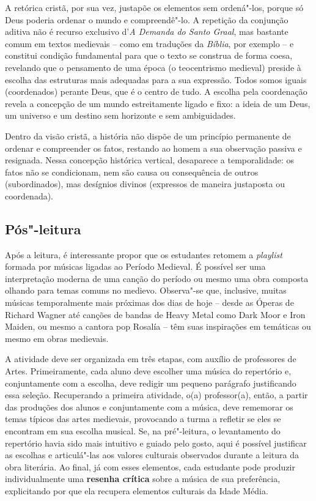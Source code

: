 \documentclass{extarticle}
\begin{document}
A retórica cristã, por sua vez, justapõe os
elementos sem ordená"-los, porque só Deus poderia ordenar o mundo e
compreendê"-lo. A repetição da conjunção aditiva não é recurso exclusivo
d'\emph{A Demanda do Santo Graal}, mas bastante comum em textos
medievais -- como em traduções da \emph{Bíblia}, por exemplo -- e
constitui condição fundamental para que o texto se construa de forma
coesa, revelando que o pensamento de uma época (o teocentrismo medieval)
preside à escolha das estruturas mais adequadas para a sua expressão.
Todos somos iguais (coordenados) perante Deus, que é o centro de tudo. A
escolha pela coordenação revela a concepção de um mundo estreitamente
ligado e fixo: a ideia de um Deus, um universo e um destino sem
horizonte e sem ambiguidades.

Dentro da visão cristã, a história não dispõe de um princípio permanente
de ordenar e compreender os fatos, restando ao homem a sua observação
passiva e resignada. Nessa concepção histórica vertical, desaparece a
temporalidade: os fatos não se condicionam, nem são causa ou
consequência de outros (subordinados), mas desígnios divinos (expressos
de maneira justaposta ou coordenada).


\subsection{Pós"-leitura}


Após a leitura, é interessante propor que os estudantes
retomem a \emph{playlist} formada por músicas ligadas ao Período
Medieval. É possível ser uma interpretação moderna de uma canção do
período ou mesmo uma obra composta olhando para temas comuns no medievo.
Observa"-se que, inclusive, muitas músicas temporalmente mais próximas
dos dias de hoje -- desde as Óperas de Richard Wagner até canções de
bandas de Heavy Metal como Dark Moor e Iron Maiden, ou mesmo a cantora
pop Rosalía -- têm suas inspirações em temáticas ou mesmo em obras
medievais.

A atividade deve ser organizada em três etapas, com auxílio de
professores de Artes. Primeiramente, cada aluno deve escolher uma música
do repertório e, conjuntamente com a escolha, deve redigir um pequeno
parágrafo justificando essa seleção. Recuperando a primeira atividade,
o(a) professor(a), então, a partir das produções dos alunos e
conjuntamente com a música, deve rememorar os temas típicos das artes
medievais, provocando a turma a refletir se eles se encontram em sua
escolha musical. Se, na pré"-leitura, o levantamento do repertório havia
sido mais intuitivo e guiado pelo gosto, aqui é possível justificar as
escolhas e articulá"-las aos valores culturais observados durante a
leitura da obra literária. Ao final, já com esses elementos, cada
estudante pode produzir individualmente uma \textbf{resenha crítica}
sobre a música de sua preferência, explicitando por que ela recupera
elementos culturais da Idade Média.
\end{document}
